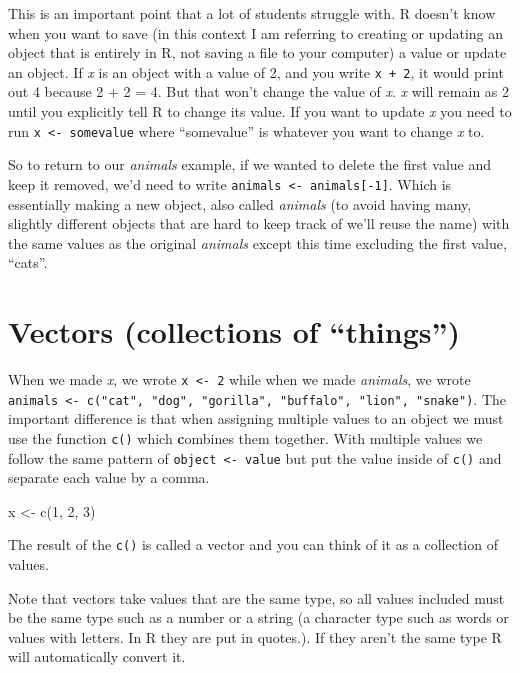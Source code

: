 \documentclass[
  12pt,
]{book}
\newenvironment{Shaded}{\begin{snugshade}}{\end{snugshade}}
\newcommand{\DecValTok}[1]{\textcolor[rgb]{0.06,0.06,0.06}{#1}}
\newcommand{\FunctionTok}[1]{\textcolor[rgb]{0,0,0}{#1}}
\newcommand{\NormalTok}[1]{#1}
\newcommand{\OtherTok}[1]{\textcolor[rgb]{0.37,0.37,0.37}{#1}}
\begin{document}
This is an important point that a lot of students struggle with. R doesn't know when you want to save (in this context I am referring to creating or updating an object that is entirely in R, not saving a file to your computer) a value or update an object. If \emph{x} is an object with a value of 2, and you write \texttt{x\ +\ 2}, it would print out 4 because 2 + 2 = 4. But that won't change the value of \emph{x}. \emph{x} will remain as 2 until you explicitly tell R to change its value. If you want to update \emph{x} you need to run \texttt{x\ \textless{}-\ somevalue} where ``somevalue'' is whatever you want to change \emph{x} to.

So to return to our \emph{animals} example, if we wanted to delete the first value and keep it removed, we'd need to write \texttt{animals\ \textless{}-\ animals{[}-1{]}}. Which is essentially making a new object, also called \emph{animals} (to avoid having many, slightly different objects that are hard to keep track of we'll reuse the name) with the same values as the original \emph{animals} except this time excluding the first value, ``cats''.

\hypertarget{vectors}{%
\section{Vectors (collections of ``things'')}\label{vectors}}

When we made \emph{x}, we wrote \texttt{x\ \textless{}-\ 2} while when we made \emph{animals}, we wrote \texttt{animals\ \textless{}-\ c("cat",\ "dog",\ "gorilla",\ "buffalo",\ "lion",\ "snake")}. The important difference is that when assigning multiple values to an object we must use the function \texttt{c()} which \textbf{c}ombines them together. With multiple values we follow the same pattern of \texttt{object\ \textless{}-\ value} but put the value inside of \texttt{c()} and separate each value by a comma.

\begin{Shaded}
\begin{Highlighting}[]
\NormalTok{x }\OtherTok{\textless{}{-}} \FunctionTok{c}\NormalTok{(}\DecValTok{1}\NormalTok{, }\DecValTok{2}\NormalTok{, }\DecValTok{3}\NormalTok{)}
\end{Highlighting}
\end{Shaded}

The result of the \texttt{c()} is called a vector and you can think of it as a collection of values.

Note that vectors take values that are the same type, so all values included must be the same type such as a number or a string (a character type such as words or values with letters. In R they are put in quotes.). If they aren't the same type R will automatically convert it.
\end{document}
